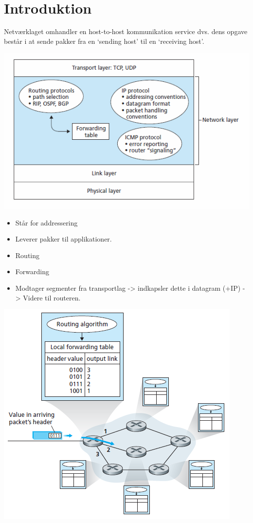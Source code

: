 \section{Introduktion}
Netværklaget omhandler en host-to-host kommunikation service dvs. dens opgave består i at sende pakker fra en ‘sending host’ til en ‘receiving host’.
\begin{center}
  \includegraphics{4-network-layer/networklayer.png}
\end{center}
\begin{itemize}
	\item Står for addressering
	\item Leverer pakker til applikationer.
	\item Routing
	\item Forwarding 
	\item Modtager segmenter fra transportlag -> indkapsler dette i datagram (+IP) -> Videre til routeren.
\end{itemize}

\includegraphics{4-network-layer/RoutingForwardring.png}

